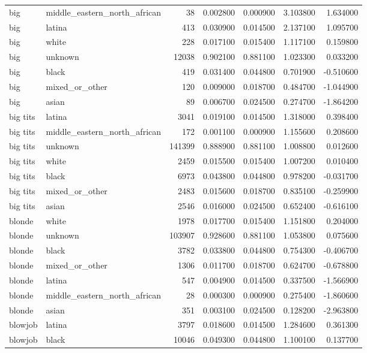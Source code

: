 \begin{tabular}{llrrrrr}
big & middle_eastern_north_african & 38 & 0.002800 & 0.000900 & 3.103800 & 1.634000 \\
big & latina & 413 & 0.030900 & 0.014500 & 2.137100 & 1.095700 \\
big & white & 228 & 0.017100 & 0.015400 & 1.117100 & 0.159800 \\
big & unknown & 12038 & 0.902100 & 0.881100 & 1.023300 & 0.033200 \\
big & black & 419 & 0.031400 & 0.044800 & 0.701900 & -0.510600 \\
big & mixed_or_other & 120 & 0.009000 & 0.018700 & 0.484700 & -1.044900 \\
big & asian & 89 & 0.006700 & 0.024500 & 0.274700 & -1.864200 \\
big tits & latina & 3041 & 0.019100 & 0.014500 & 1.318000 & 0.398400 \\
big tits & middle_eastern_north_african & 172 & 0.001100 & 0.000900 & 1.155600 & 0.208600 \\
big tits & unknown & 141399 & 0.888900 & 0.881100 & 1.008800 & 0.012600 \\
big tits & white & 2459 & 0.015500 & 0.015400 & 1.007200 & 0.010400 \\
big tits & black & 6973 & 0.043800 & 0.044800 & 0.978200 & -0.031700 \\
big tits & mixed_or_other & 2483 & 0.015600 & 0.018700 & 0.835100 & -0.259900 \\
big tits & asian & 2546 & 0.016000 & 0.024500 & 0.652400 & -0.616100 \\
blonde & white & 1978 & 0.017700 & 0.015400 & 1.151800 & 0.204000 \\
blonde & unknown & 103907 & 0.928600 & 0.881100 & 1.053800 & 0.075600 \\
blonde & black & 3782 & 0.033800 & 0.044800 & 0.754300 & -0.406700 \\
blonde & mixed_or_other & 1306 & 0.011700 & 0.018700 & 0.624700 & -0.678800 \\
blonde & latina & 547 & 0.004900 & 0.014500 & 0.337500 & -1.566900 \\
blonde & middle_eastern_north_african & 28 & 0.000300 & 0.000900 & 0.275400 & -1.860600 \\
blonde & asian & 351 & 0.003100 & 0.024500 & 0.128200 & -2.963800 \\
blowjob & latina & 3797 & 0.018600 & 0.014500 & 1.284600 & 0.361300 \\
blowjob & black & 10046 & 0.049300 & 0.044800 & 1.100100 & 0.137700 \\

\end{tabular}
